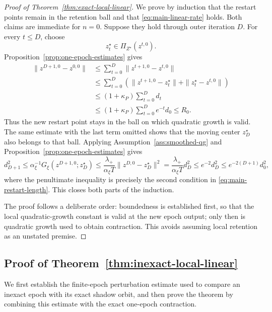 \documentclass[letterpaper]{article} %
\theoremstyle{definition}
\theoremstyle{remark}
\begin{document}
\begin{proof}[Proof of Theorem~\ref{thm:exact-local-linear}]
We prove by induction that the restart points remain in the retention ball
and that \eqref{eq:main-linear-rate} holds.  Both claims are immediate for
$n=0$.  Suppose they hold through outer iteration $D$.  For every
$t\le D$, choose
\[
    z_t^\star
    \in
    \Pi_{Z^\star}(z^{t,0}).
\]
Proposition~\ref{prop:one-epoch-estimates} gives
\[
\begin{aligned}
    \|z^{D+1,0}-z^{0,0}\|
    &\le
    \sum_{t=0}^{D}\|z^{t+1,0}-z^{t,0}\|\\
    &\le
    \sum_{t=0}^{D}
    \left(
        \|z^{t+1,0}-z_t^\star\|
        +
        \|z_t^\star-z^{t,0}\|
    \right)\\
    &\le
    (1+\kappa_P)\sum_{t=0}^{D}d_t\\
    &\le
    (1+\kappa_P)\sum_{t=0}^{D}e^{-t}d_0
    \le
    R_0.
\end{aligned}
\]
Thus the new restart point stays in the ball on which quadratic growth is
valid.  The same estimate with the last term omitted shows that the moving
center $z_D^\star$ also belongs to that ball.  Applying
Assumption~\ref{ass:smoothed-qg} and
Proposition~\ref{prop:one-epoch-estimates} gives
\[
    d_{D+1}^2 \le \alpha_\xi^{-1} G_\xi(z^{D+1,0};z_D^\star) \le \frac{\lambda_+}{\alpha_\xi T} \|z^{D,0}-z_D^\star\|^2 = \frac{\lambda_+}{\alpha_\xi T}d_D^2 \le e^{-2}d_D^2 \le e^{-2(D+1)}d_0^2,
\]
where the penultimate inequality is precisely the second condition in
\eqref{eq:main-restart-length}.  This closes both parts of the induction.

The proof follows a deliberate order: boundedness is established first, so
that the local quadratic-growth constant is valid at the new epoch output;
only then is quadratic growth used to obtain contraction.  This avoids
assuming local retention as an unstated premise.
\end{proof}

\subsection{Proof of Theorem~\ref{thm:inexact-local-linear}}
\label{app:proof-inexact-local-linear}

We first establish the finite-epoch perturbation estimate used to compare an
inexact epoch with its exact shadow orbit, and then prove the theorem by
combining this estimate with the exact one-epoch contraction.
\end{document}
